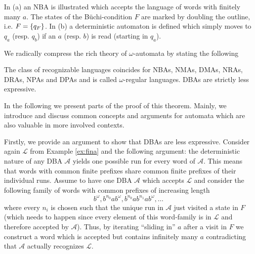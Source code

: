 \begin{drawing}
  \caption{In (a) an \ac{NBA} is illustrated which accepts the language of
  words with finitely many $a$. The states of the Büchi-condition $F$ are
  marked by doubling the outline, i.e. $F = \left\{q_{F}\right\}$.
  In (b) a deterministic automaton is defined which simply moves to $q_{a}$
  (resp. $q_{b}$) if an $a$ (resp. $b$) is read (starting in $q_{a}$).}
  \label{fig:finaautomata}
\end{drawing}
We radically compress the rich theory of $\omega$-automata by stating the
following
\begin{theorem}
  \cite[Theorem 1.19, Theorem 1.24, Section 1.3.2,Theorem 3.2]{AutoLogInfGames}
  The class of recognizable languages coincides for \acp{NBA}, \acp{NMA},
  \acp{DMA}, \acp{NRA}, \acp{DRA}, \acp{NPA} and \acp{DPA} and is called
  $\omega$-regular languages. \acp{DBA} are strictly less expressive.
  \label{thm:omegaregularexp}
\end{theorem}
In the following we present parts of the proof of this theorem. Mainly, we
introduce and discuss common concepts and arguments for automata which are also 
valuable in more involved contexts.

Firstly, we provide an argument to show that \acp{DBA} are less expressive.
Consider again $\mathcal{L}$ from Example \ref{ex:fina} and the following
argument: the deterministic nature of any \ac{DBA} $\mathcal{A}$ yields one
possible run for every word of $\mathcal{A}$. This means that words with
common finite prefixes share common finite prefixes of their individual runs.
Assume to have one \ac{DBA} $\mathcal{A}$ which accepts $\mathcal{L}$ and
consider the following family of words with common prefixes of increasing 
length
\begin{equation*}
  b^{\omega}, b^{n_{0}}ab^{\omega}, b^{n_{0}}ab^{n_{1}}ab^{\omega}, \dots
\end{equation*}
where every $n_{i}$ is chosen such that the unique run in $\mathcal{A}$
just visited a state in $F$ (which needs to happen since every element of
this word-family is in $\mathcal{L}$ and therefore accepted by
$\mathcal{A}$). Thus, by iterating \enquote{sliding in} $a$ after a visit in
$F$ we construct a word which is accepted but contains infinitely many $a$
contradicting that $\mathcal{A}$ actually recognizes $\mathcal{L}$.

